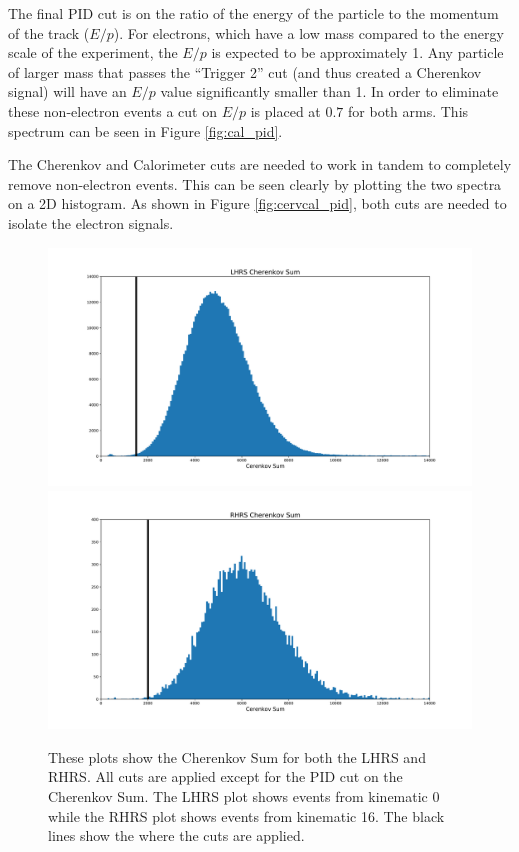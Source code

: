 The final PID cut is on the ratio of the energy of the particle to the momentum of the track ($E/p$). For electrons, which have a low mass compared to the energy scale of the experiment, the $E/p$ is expected to be approximately 1. Any particle of larger mass that passes the ``Trigger 2'' cut (and thus created a Cherenkov signal) will have an $E/p$ value significantly smaller than 1. In order to eliminate these non-electron events a cut on $E/p$ is placed at $0.7$ for both arms. This spectrum can be seen in Figure \ref{fig:cal_pid}.

The Cherenkov and Calorimeter cuts are needed to work in tandem to completely remove non-electron events. This can be seen clearly by plotting the two spectra on a 2D histogram. As shown in Figure \ref{fig:cervcal_pid}, both cuts are needed to isolate the electron signals.

\begin{figure}
\begin{center}
	\includegraphics[width=\textwidth]{./analysis/fig/LCer_pid.pdf}
	\includegraphics[width=\textwidth]{./analysis/fig/RCer_pid.pdf}
	\caption{These plots show the Cherenkov Sum for both the LHRS and RHRS. All cuts are applied except for the PID cut on the Cherenkov Sum. The LHRS plot shows events from kinematic 0 while the RHRS plot shows events from kinematic 16. The black lines show the where the cuts are applied.}
	\label{fig:cer_pid}
\end{center}
\end{figure}

